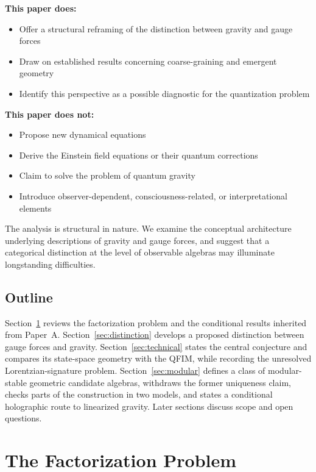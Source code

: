 \documentclass[12pt,a4paper]{article}
\begin{document}
\textbf{This paper does:}
\begin{itemize}
    \item Offer a structural reframing of the distinction between gravity and gauge forces
    \item Draw on established results concerning coarse-graining and emergent geometry
    \item Identify this perspective as a possible diagnostic for the quantization problem
\end{itemize}

\textbf{This paper does not:}
\begin{itemize}
    \item Propose new dynamical equations
    \item Derive the Einstein field equations or their quantum corrections
    \item Claim to solve the problem of quantum gravity
    \item Introduce observer-dependent, consciousness-related, or interpretational elements
\end{itemize}

The analysis is structural in nature. We examine the conceptual architecture underlying descriptions of gravity and gauge forces, and suggest that a categorical distinction at the level of observable algebras may illuminate longstanding difficulties.

\subsection{Outline}

Section~\ref{sec:factorization} reviews the factorization problem and the conditional results inherited from Paper~A. Section~\ref{sec:distinction} develops a proposed distinction between gauge forces and gravity. Section~\ref{sec:technical} states the central conjecture and compares its state-space geometry with the QFIM, while recording the unresolved Lorentzian-signature problem. Section~\ref{sec:modular} defines a class of modular-stable geometric candidate algebras, withdraws the former uniqueness claim, checks parts of the construction in two models, and states a conditional holographic route to linearized gravity. Later sections discuss scope and open questions.

\section{The Factorization Problem}
\label{sec:factorization}
\end{document}
